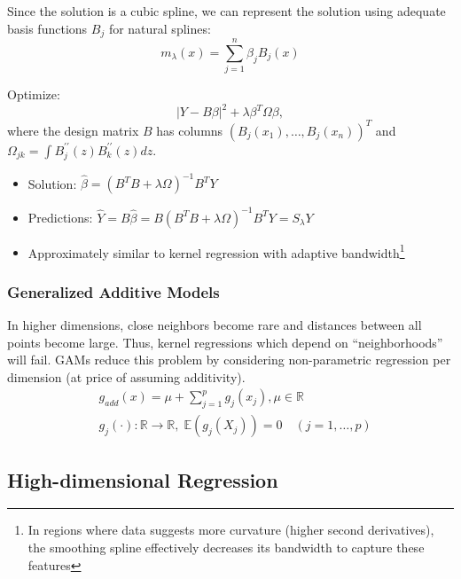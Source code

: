 \documentclass[11pt, %
	oneside, %
	english, %
	onehalfspacing, %
	]{article} %
\numberwithin{equation}{section}
\begin{document}
Since the solution is a cubic spline, we can represent the solution using adequate basis functions $B_j$ for natural splines:
\begin{equation*}
    m_\lambda(x)=\sum_{j=1}^n \beta_j B_j(x)
\end{equation*}

Optimize:
$$
|Y-B \beta|^2+\lambda \beta^T \Omega \beta,$$
where the design matrix $B$ has columns $\left(B_j\left(x_1\right), \ldots, B_j\left(x_n\right)\right)^T$ and $\Omega_{j k}=\int B_j^{\prime \prime}(z) B_k^{\prime \prime}(z) d z$.

\begin{itemize}
    \item Solution: $\hat{\beta}=\left(B^T B+\lambda \Omega\right)^{-1} B^T Y$
    \item Predictions: $\hat{Y}=B \hat{\beta}=B\left(B^T B+\lambda \Omega\right)^{-1} B^T Y=S_\lambda Y$
    \item Approximately similar to kernel regression with adaptive bandwidth\footnote{In regions where data suggests more curvature (higher second derivatives), the smoothing spline effectively decreases its bandwidth to capture these features}
\end{itemize}


\subsubsection*{Generalized Additive Models}

In higher dimensions, close neighbors become rare and distances between all points become large. Thus, kernel regressions which depend on ``neighborhoods'' will fail. GAMs reduce this problem by considering non-parametric regression per dimension (at price of assuming additivity).
\begin{equation*}
    \begin{aligned}
        & g_{a d d}(x)=\mu+\sum_{j=1}^p g_j\left(x_j\right), \mu \in \mathbb{R} \\
        & g_j(\cdot): \mathbb{R} \rightarrow \mathbb{R}, \; \mathbb{E}\left(g_j\left(X_j\right)\right)=0 \quad (j=1, \ldots, p)
    \end{aligned}
\end{equation*}



\subsection{High-dimensional Regression}
\end{document}
